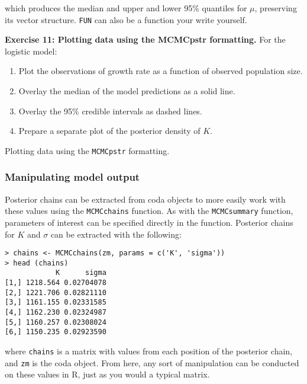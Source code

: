 \documentclass[12pt,english]{article}
\begin{document}
\noindent which produces the median and upper and lower 95\% quantiles for $\mu$, preserving its vector structure. \texttt{FUN} can also be a function your write yourself.

\bigskip
\belowcaptionskip=-40pt
\begin{exercise}
\begin{mdframed}
\doublespacing
\textbf{Exercise 11: Plotting data using the MCMCpstr formatting.} For the logistic model:
\begin{enumerate}
\item Plot the observations of growth rate as a function of observed population size.
\item Overlay the median of the model predictions as a solid line.
\item Overlay the 95\% credible intervals as dashed lines.
\item Prepare a separate plot of the posterior density of $K$.
\end{enumerate}
\end{mdframed}
\captionsetup{textformat=empty, labelformat=empty}
\caption[Plotting data using the \texttt{MCMCpstr} formatting]{Plotting data using the \texttt{MCMCpstr} formatting.}
\label{ex:plotting objects}
\end{exercise}
\belowcaptionskip=0pt

\subsubsection{Manipulating model output}

Posterior chains can be extracted from coda objects to more easily work with these values using the \texttt{MCMCchains} function. As with the \texttt{MCMCsummary} function, parameters of interest can be specified directly in the function. Posterior chains for $K$ and $\sigma$ can be extracted with the following:

\begin{Verbatim}
> chains <- MCMCchains(zm, params = c('K', 'sigma'))
> head (chains)
            K      sigma
[1,] 1218.564 0.02704078
[2,] 1221.706 0.02821110
[3,] 1161.155 0.02331585
[4,] 1162.230 0.02324987
[5,] 1160.257 0.02308024
[6,] 1150.235 0.02923590
\end{Verbatim}
	
\noindent where \texttt{chains} is a matrix with values from each position of the posterior chain, and \texttt{zm} is the coda object. From here, any sort of manipulation can be conducted on these values in R, just as you would a typical matrix.
\end{document}
